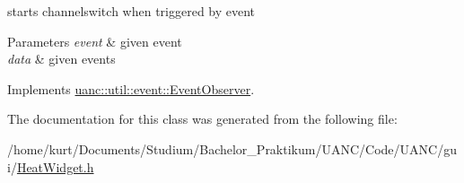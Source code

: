 starts channelswitch when triggered by event 


\begin{DoxyParams}{Parameters}
{\em event} & given event \\
\hline
{\em data} & given events \\
\hline
\end{DoxyParams}


Implements \hyperlink{classuanc_1_1util_1_1event_1_1_event_observer_af1640e34db3379eaba8c817a92199807}{uanc\+::util\+::event\+::\+Event\+Observer}.



The documentation for this class was generated from the following file\+:\begin{DoxyCompactItemize}
\item 
/home/kurt/\+Documents/\+Studium/\+Bachelor\+\_\+\+Praktikum/\+U\+A\+N\+C/\+Code/\+U\+A\+N\+C/gui/\hyperlink{_heat_widget_8h}{Heat\+Widget.\+h}\end{DoxyCompactItemize}
